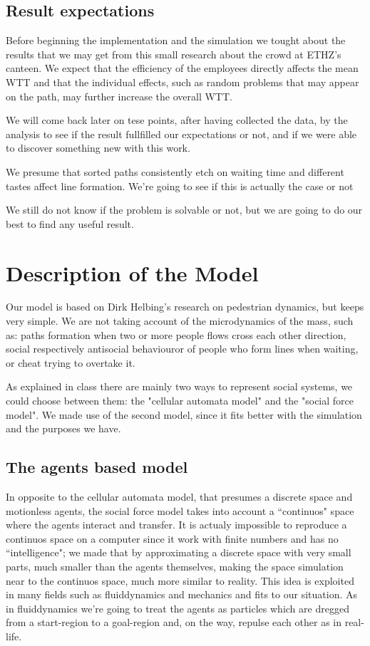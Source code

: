 \documentclass[11pt]{article}
\begin{document}
\subsection{Result expectations}

Before beginning the implementation and the simulation we tought about the results that we may get from this small research about the crowd at ETHZ's canteen. We expect that the efficiency of the employees directly affects the mean WTT and that the individual effects, such as random problems that may appear on the path, may further increase the overall WTT.
 
We will come back later on tese points, after having collected the data, by the analysis to see if the result fullfilled our expectations or not, and if we were able to discover something new with this work.

We presume that sorted paths consistently etch on waiting time and different tastes affect line formation. We're going to see if this is actually the case or not

We still do not know if the problem is solvable or not, but we are going to do our best to find any useful result. 

\newpage

\section{Description of the Model}

Our model is based on Dirk Helbing's research on pedestrian dynamics, but keeps very simple. We are not taking account of the microdynamics of the mass, such as: paths formation when two or more people flows cross each other direction, social respectively antisocial behaviouror of people who form lines when waiting, or cheat trying to overtake it.

As explained in class there are mainly two ways to represent social systems, we could choose between them: the "cellular automata model" and the "social force model". We made use of the second model, since it fits better with the simulation and the purposes we have.


\subsection{The agents based model}

In opposite to the cellular automata model, that presumes a discrete space and motionless agents, the social force model takes into account a ``continuos" space where the agents interact and transfer. It is actualy impossible to reproduce a continuos space on a computer since it work with finite numbers and has no ``intelligence"; we made that by approximating a discrete space with very small parts, much smaller than the agents themselves, making the space simulation near to the continuos space, much more similar to reality. This idea is exploited in many fields such as fluiddynamics and mechanics and fits to our situation. As in fluiddynamics we're going to treat the agents as particles which are dregged from a start-region to a goal-region and, on the way, repulse each other as in real-life.
\end{document}
